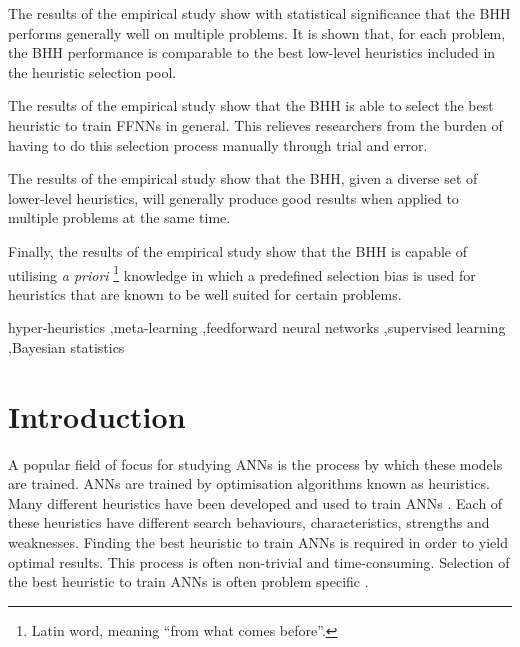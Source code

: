 \documentclass[preprint,review,12pt]{elsarticle}
\begin{document}
\begin{frontmatter}
\begin{highlights}
		\item The results of the empirical study show with statistical significance that the \acs{BHH} performs generally well on multiple problems. It is shown that, for each problem, the \acs{BHH} performance is comparable to the best low-level heuristics included in the heuristic selection pool.

		\item The results of the empirical study show that the \acs{BHH} is able to select the best heuristic to train \acp{FFNN} in general. This relieves researchers from the burden of having to do this selection process manually through trial and error.

		\item The results of the empirical study show that the \acs{BHH}, given a diverse set of lower-level heuristics, will generally produce good results when applied to multiple problems at the same time.

		\item Finally, the results of the empirical study show that the \acs{BHH} is capable of utilising \textit{a priori} \footnote{Latin word, meaning ``from what comes before''.} knowledge in which a predefined selection bias is used for heuristics that are known to be well suited for certain problems.
	\end{highlights}


	\begin{keyword}
		hyper-heuristics \sep meta-learning \sep feedforward neural networks \sep supervised learning \sep Bayesian statistics
	\end{keyword}
\end{frontmatter}

\section{Introduction}
\label{sec:introduction}

A popular field of focus for studying \acfp{ANN} is the process by which these models are trained. \acp{ANN} are trained by optimisation algorithms known as heuristics. Many different heuristics have been developed and used to train \acp{ANN} \citep{ref:rakitianskaia:2012}. Each of these heuristics have different search behaviours, characteristics, strengths and weaknesses. Finding the best heuristic to train \acp{ANN} is required in order to yield optimal results. This process is often non-trivial and time-consuming. Selection of the best heuristic to train \acp{ANN} is often problem specific \citep{ref:allen:1996}.
\end{document}
